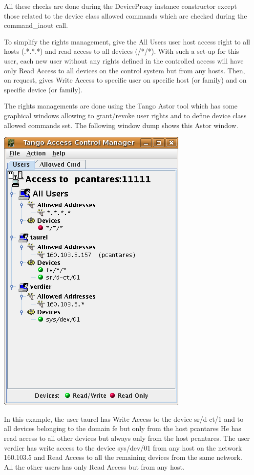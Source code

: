All these checks are done during the DeviceProxy instance constructor
except those related to the device class allowed commands which are
checked during the command\_inout call.

To simplify the rights management, give the \textquotedbl{}All Users\textquotedbl{}
user host access right to all hosts (\textquotedbl{}{*}.{*}.{*}.{*}\textquotedbl{})
and read access to all devices (\textquotedbl{}{*}/{*}/{*}\textquotedbl{}).
With such a set-up for this user, each new user without any rights
defined in the controlled access will have only Read Access to all
devices on the control system but from any hosts. Then, on request,
gives Write Access to specific user on specific host (or family) and
on specific device (or family). 

The rights managements are done using the Tango Astor\cite{Astor_doc}
tool which has some graphical windows allowing to grant/revoke user
rights and to define device class allowed commands set. The following
window dump shows this Astor window.\begin{center}\includegraphics{advanced/control}\end{center}

In this example, the user \textquotedbl{}taurel\textquotedbl{} has
Write Access to the device \textquotedbl{}sr/d-ct/1\textquotedbl{}
and to all devices belonging to the domain \textquotedbl{}fe\textquotedbl{}
but only from the host \textquotedbl{}pcantares\textquotedbl{} He
has read access to all other devices but always only from the host
pcantares. The user \textquotedbl{}verdier\textquotedbl{} has write
access to the device \textquotedbl{}sys/dev/01\textquotedbl{} from
any host on the network \textquotedbl{}160.103.5\textquotedbl{} and
Read Access to all the remaining devices from the same network. All
the other users has only Read Access but from any host.

